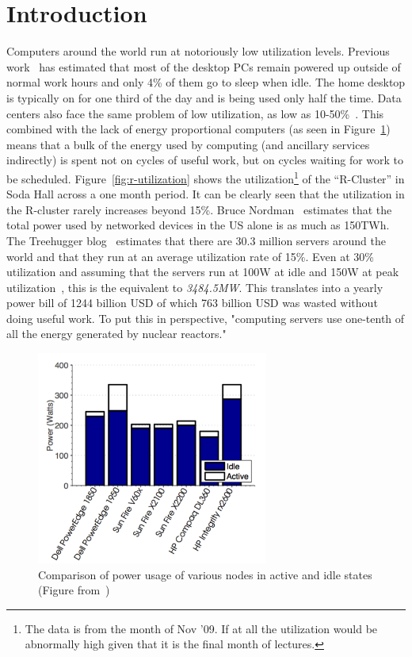 \section{Introduction} %
\label{sec:introduction}
Computers around the world run at notoriously low utilization levels. Previous work~\cite{Kurt:07,Judy:04} has estimated that most of the desktop PCs remain powered up outside of normal work hours and only 4\% of them go to sleep when idle. The home desktop is typically on for one third of the day and is being used only half the time. Data centers also face the same problem of low utilization, as low as 10-50\%~\cite{Luiz:07,Albert:09}. This combined with the lack of energy proportional computers (as seen in Figure~\ref{fig:active-idle-power}) means that a bulk of the energy used by computing (and ancillary services indirectly) is spent not on cycles of useful work, but on cycles waiting for work to be scheduled. Figure~\ref{fig:r-utilization} shows the utilization\footnote{The data is from the month of Nov '09. If at all the utilization would be abnormally high given that it is the final month of lectures.} of the ``R-Cluster'' in Soda Hall across a one month period. It can be clearly seen that the utilization in the R-cluster rarely increases beyond 15\%. Bruce Nordman~\cite{Bruce:08} estimates that the total power used by networked devices in the US alone is as much as 150TWh. The Treehugger blog~\cite{TreeHugger:08} estimates that there are 30.3 million servers around the world and that they run at an average utilization rate of 15\%. Even at 30\% utilization and assuming that the servers run at 100W at idle and 150W at peak utilization~\cite{Yuvraj:09}, this is the equivalent to {\em 3484.5MW}. This translates into a yearly power bill of 1244 billion USD of which 763 billion USD was wasted without doing useful work. To put this in perspective, "computing servers use one-tenth of all the energy generated by nuclear reactors."~\cite{Robert:06}

\begin{figure}[ht]
\centering
\begin{center}
\includegraphics[width=3.0in]{graphs/steve-TR-idle-active.pdf}
\vspace{-0.1in}
\caption{{\normalsize Comparison of power usage of various nodes in active and idle states (Figure from~\cite{Dawson-Haggerty:09})}\label{fig:active-idle-power}}
\vspace{-0.1in}
\end{center}
\end{figure}

